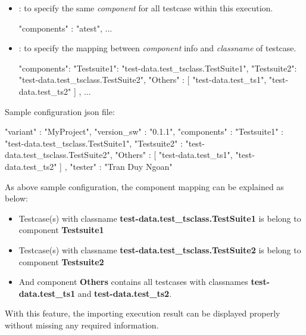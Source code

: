 \begin{itemize}
\begin{itemize}
        \begin{itemize}
        \tightlist
        \item
          : to specify the same \emph{component} for all testcase
          within this execution.
\begin{robotcode}
{
  "components" : "atest",
  ...
}
\end{robotcode}
        \item
          : to specify the mapping between \emph{component} info
          and \emph{classname} of testcase.
\begin{robotcode}
{
  "components": {
    "Testsuite1": "test-data.test_tsclass.TestSuite1",
    "Testsuite2": "test-data.test_tsclass.TestSuite2",
    "Others"    : [
        "test-data.test_ts1",
        "test-data.test_ts2"
    ]
  },
  ...
}
\end{robotcode}
        \end{itemize}
  \end{itemize}
\end{itemize}
Sample configuration json file:

\begin{pythoncode}
{
   "variant"    :  "MyProject",
   "version_sw" :  "0.1.1",
   "components" :  {
      "Testsuite1" :     "test-data.test_tsclass.TestSuite1",
      "Testsuite2" :     "test-data.test_tsclass.TestSuite2",
      "Others"     :     [
         "test-data.test_ts1",
         "test-data.test_ts2"
      ]
   },
   "tester"     :  "Tran Duy Ngoan"
}
\end{pythoncode}

As above sample configuration, the component mapping can be explained as
below:

\begin{itemize}
\tightlist
\item
  Testcase(s) with classname \textbf{test-data.test\_tsclass.TestSuite1}
  is belong to component \textbf{Testsuite1}
\item
  Testcase(s) with classname \textbf{test-data.test\_tsclass.TestSuite2}
  is belong to component \textbf{Testsuite2}
\item
  And component \textbf{Others} contains all testcases with classnames
  \textbf{test-data.test\_ts1} and \textbf{test-data.test\_ts2}.
\end{itemize}

With this feature, the importing execution result can be displayed
properly without missing any required information.


